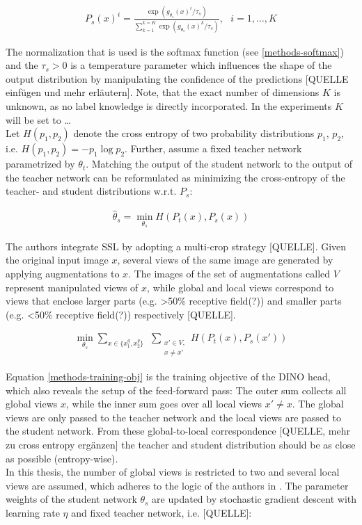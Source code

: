 \begin{align}
	P_s(x)^i = \frac{\exp(g_{\theta_s}(x)^i/\tau_s)}{\sum_{k=1}^{k=K}\exp(g_{\theta_s}(x)^k/\tau_s)}, \hspace{8pt} i=1,\dots,K
	\label{methods-softmax}
\end{align}

The normalization that is used is the softmax function (see \ref{methods-softmax}) and the $\tau_s > 0$ is a temperature parameter which influences the shape of the output distribution by manipulating the confidence of the predictions [QUELLE einfügen und mehr erläutern].
Note, that the exact number of dimensions $K$ is unknown, as no label knowledge is directly incorporated.
In the experiments $K$ will be set to \dots
\\
Let $H(p_1,p_2)$ denote the cross entropy of two probability distributions $p_1$, $p_2$, i.e. $H(p_1,p_2)=-p_1 \log p_2$.
Further, assume a fixed teacher network parametrized by $\theta_t$.
Matching the output of the student network to the output of the teacher network can be reformulated as minimizing the cross-entropy of the teacher- and student distributions w.r.t. $P_s$:

\begin{align}
	\hat{\theta}_s = \min_{\theta_s}H(P_t(x),P_s(x))
\end{align}

The authors integrate SSL by adopting a multi-crop strategy [QUELLE].
Given the original input image $x$, several views of the same image are generated by applying augmentations to $x$.
The images of the set of augmentations called $V$ represent manipulated views of $x$, while global and local views correspond to views that enclose larger parts (e.g. >50\% receptive field(?)) and smaller parts (e.g. <50\% receptive field(?)) respectively [QUELLE].

\begin{align}
	\min_{\theta_s}\sum_{x \in \{x_1^g, x_2^g\}} \hspace{5pt} \sum_{\substack{ x'\in V, \\ x\neq x'}} H(P_t(x),P_s(x'))
	\label{methods-training-obj}
\end{align}

Equation \ref{methods-training-obj} is the training objective of the DINO head, which also reveals the setup of the feed-forward pass:
The outer sum collects all global views $x$, while the inner sum goes over all local views $x'\neq x$.
The global views are only passed to the teacher network and the local views are passed to the student network.
From these global-to-local correspondence [QUELLE, mehr zu cross entropy ergänzen] the teacher and student distribution should be as close as possible (entropy-wise).
\\
In this thesis, the number of global views is restricted to two and several local views are assumed, which adheres to the logic of the authors in \citep{Caron2021}. 
The parameter weights of the student network $\theta_s$ are updated by stochastic gradient descent with learning rate $\eta$ and fixed teacher network, i.e. [QUELLE]:

